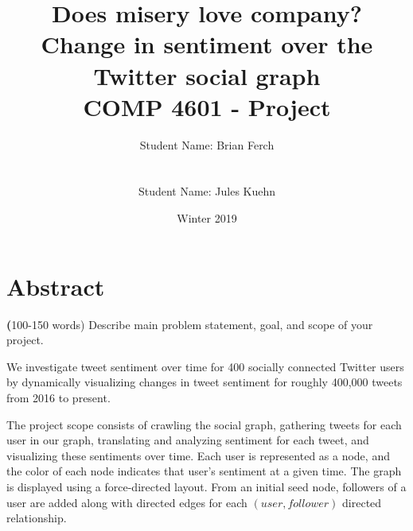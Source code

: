 \documentclass[12pt]{article}
\begin{document}
\title {
    Does misery love company?\\
    Change in sentiment over the Twitter social graph\\
    \large COMP 4601 - Project}
\author{Student Name: Brian Ferch\\
\\\\ 
Student Name: Jules Kuehn\\
}
\date{Winter 2019}
\maketitle


% 



\section{Abstract}
\textbf (100-150 words) Describe main problem statement, goal, and scope of your project.\newline

We investigate tweet sentiment over time for 400 socially connected Twitter users by dynamically visualizing changes in tweet sentiment for roughly 400,000 tweets from 2016 to present.\newline

The project scope consists of crawling the social graph, gathering tweets for each user in our graph, translating and analyzing sentiment for each tweet, and visualizing these sentiments over time. Each user is represented as a node, and the color of each node indicates that user’s sentiment at a given time. The graph is displayed using a force-directed layout. From an initial seed node, followers of a user are added along with directed edges for each $(user, follower)$ directed relationship.
\end{document}
